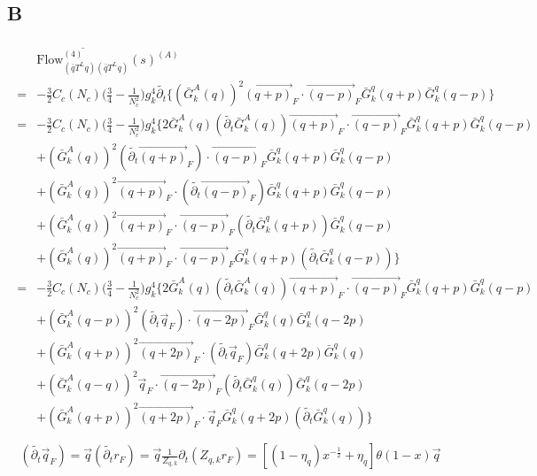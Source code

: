 \documentclass[12pt]{article}
\begin{document}
\subsection{B}
\begin{eqnarray}
\begin{split}
&\overline{ \text{Flow}_{(\bar q T^L q) (\bar q T^L q)}^{(4)}}(s)^{(A)}\\
=&- \frac{3}{2} C_c(N_c)\big( \frac{3}{4} -\frac{1}{N_c^2}\big)g_k^4 \tilde{\partial_t} \big \{ (\bar G^A_k(q))^2 \overrightarrow{(q+p)}_F \cdot \overrightarrow{(q-p)}_F \bar G_k^q(q+p) \bar G_k^q (q-p) \big \}\\
=&- \frac{3}{2} C_c(N_c)\big( \frac{3}{4} -\frac{1}{N_c^2}\big)g_k^4 \big \{ 2 \bar G^A_k(q) ( \tilde{\partial_t} \bar G^A_k(q))\overrightarrow{(q+p)}_F \cdot \overrightarrow{(q-p)}_F \bar G_k^q(q+p) \bar G_k^q (q-p)\\
&+(\bar G^A_k(q))^2(\tilde{\partial_t}\overrightarrow{(q+p)}_F) \cdot \overrightarrow{(q-p)}_F \bar G_k^q(q+p) \bar G_k^q (q-p)\\
&+(\bar G^A_k(q))^2\overrightarrow{(q+p)}_F\cdot (\tilde{\partial_t}\overrightarrow{(q-p)}_F) \bar G_k^q(q+p) \bar G_k^q (q-p)\\
&+(\bar G^A_k(q))^2\overrightarrow{(q+p)}_F\cdot \overrightarrow{(q-p)}_F (\tilde{\partial_t}\bar G_k^q(q+p)) \bar G_k^q (q-p)\\
&+(\bar G^A_k(q))^2\overrightarrow{(q+p)}_F\cdot \overrightarrow{(q-p)}_F \bar G_k^q(q+p) (\tilde{\partial_t}\bar G_k^q (q-p))\big \}\\
=&- \frac{3}{2} C_c(N_c)\big( \frac{3}{4} -\frac{1}{N_c^2}\big)g_k^4 \big \{ 2 \bar G^A_k(q) ( \tilde{\partial_t} \bar G^A_k(q))\overrightarrow{(q+p)}_F \cdot \overrightarrow{(q-p)}_F \bar G_k^q(q+p) \bar G_k^q (q-p)\\
&+(\bar G^A_k(q-p))^2(\tilde{\partial_t}\vec q_F) \cdot \overrightarrow{(q-2p)}_F \bar G_k^q(q) \bar G_k^q (q-2p)\\
&+(\bar G^A_k(q+p))^2\overrightarrow{(q+2p)}_F\cdot (\tilde{\partial_t} \vec q_F) \bar G_k^q(q+2p) \bar G_k^q (q)\\
&+(\bar G^A_k(q-q))^2\vec q_F\cdot \overrightarrow{(q-2p)}_F (\tilde{\partial_t}\bar G_k^q(q)) \bar G_k^q (q-2p)\\
&+(\bar G^A_k(q+p))^2\overrightarrow{(q+2p)}_F\cdot \vec q_F \bar G_k^q(q+2p) (\tilde{\partial_t}\bar G_k^q (q))\big \}\\
\end{split}
\end{eqnarray}
\begin{eqnarray}
(\tilde{\partial_t} \vec q_F) = \vec{q} (\tilde{\partial_t} r_F ) =\vec{q}  \frac{1}{Z_{q,k}} \partial_t(Z_{q,k} r_F)=[(1-\eta_q)x^{-\frac{1}{2}} + \eta_q] \theta(1-x) \vec{q}  
\end{eqnarray}
\end{document}
